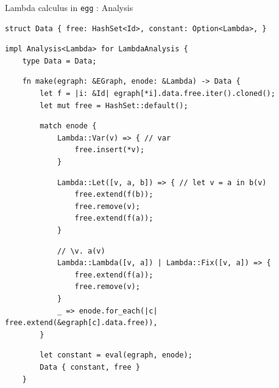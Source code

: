 \documentclass[8pt]{beamer}
\newcommand{\egg}{\texttt{egg} }
\begin{document}
\begin{frame}[fragile]{Lambda calculus in \egg: Analysis}
\begin{verbatim}
struct Data { free: HashSet<Id>, constant: Option<Lambda>, }
\end{verbatim}
\pause
\begin{verbatim}
impl Analysis<Lambda> for LambdaAnalysis {
    type Data = Data;
\end{verbatim}
\pause
\begin{verbatim}
    fn make(egraph: &EGraph, enode: &Lambda) -> Data {
        let f = |i: &Id| egraph[*i].data.free.iter().cloned();
        let mut free = HashSet::default();
\end{verbatim}
\pause
\begin{verbatim}
        match enode {
            Lambda::Var(v) => { // var
                free.insert(*v);
            }
\end{verbatim}
\pause
\begin{verbatim}
            Lambda::Let([v, a, b]) => { // let v = a in b(v)
                free.extend(f(b));
                free.remove(v);
                free.extend(f(a));
            }
\end{verbatim}
\pause
\begin{verbatim}
            // \v. a(v)
            Lambda::Lambda([v, a]) | Lambda::Fix([v, a]) => {
                free.extend(f(a));
                free.remove(v);
            }
            _ => enode.for_each(|c| free.extend(&egraph[c].data.free)),
        }
\end{verbatim}
\pause
\begin{verbatim}
        let constant = eval(egraph, enode);
        Data { constant, free }
    }
\end{verbatim}
\end{frame}
\end{document}

